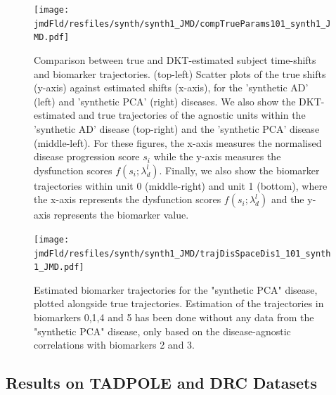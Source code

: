 \documentclass{llncs}
\begin{document}
\begin{figure}
\texttt{[image: \\jmdFld/resfiles/synth/synth1\_JMD/compTrueParams101\_synth1\_JMD.pdf]}
 \caption[DKT Simulation Results - Comparison between true and DKT-estimated biomarker trajectories and subject time-shifts.]{Comparison between true and DKT-estimated subject time-shifts and biomarker trajectories. (top-left) Scatter plots of the true shifts (y-axis) against estimated shifts (x-axis), for the 'synthetic AD' (left) and 'synthetic PCA' (right) diseases. We also show the DKT-estimated and true trajectories of the agnostic units within the 'synthetic AD' disease (top-right) and the 'synthetic PCA' disease (middle-left). For these figures, the x-axis measures the normalised disease progression score $s_i$ while the y-axis measures the dysfunction scores $f(s_i;\lambda_d^l)$. Finally, we also show the biomarker trajectories within unit 0 (middle-right) and unit 1 (bottom), where the x-axis represents the dysfunction scores $f(s_i;\lambda_d^l)$ and the y-axis represents the biomarker value.}
 \label{fig:dktSynthTrajCompTrue}
\end{figure}

\begin{figure}
\texttt{[image: \\jmdFld/resfiles/synth/synth1\_JMD/trajDisSpaceDis1\_101\_synth1\_JMD.pdf]}
 \caption[Estimated biomarker trajectories for the "synthetic PCA" disease, plotted alongside true trajectories]{Estimated biomarker trajectories for the "synthetic PCA" disease, plotted alongside true trajectories. Estimation of the trajectories in biomarkers 0,1,4 and 5 has been done without any data from the "synthetic PCA" disease, only based on the disease-agnostic correlations with biomarkers 2 and 3.}
 \label{fig:dktSynthTrajDrcSpace}
\end{figure}



\subsection{Results on TADPOLE and DRC Datasets}
\label{sec:dktResTadDrc}
\end{document}
